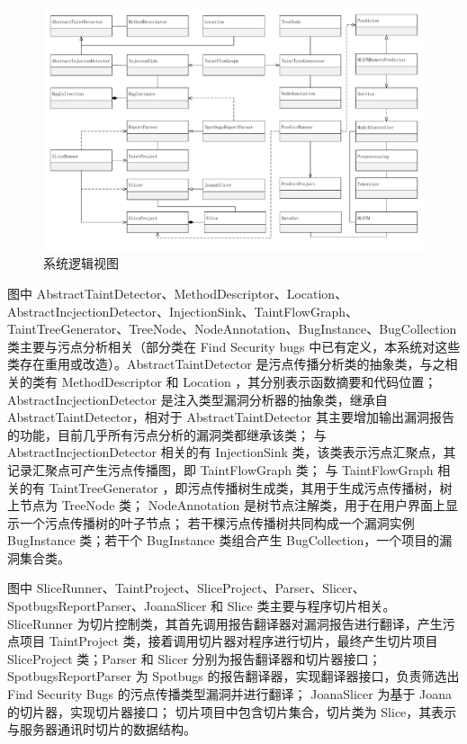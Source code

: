 \begin{figure}[!htbp]
    \centering
    \includegraphics[width=5in]{FIGs/chapter3/viewlogic.pdf}
    \caption{系统逻辑视图}\label{view:logic}
\end{figure}

图中 AbstractTaintDetector、MethodDescriptor、Location、AbstractIncjectionDetector、InjectionSink、TaintFlowGraph、TaintTreeGenerator、TreeNode、NodeAnnotation、BugInstance、BugCollection 类主要与污点分析相关（部分类在 Find Security bugs 中已有定义，本系统对这些类存在重用或改造）。AbstractTaintDetector 是污点传播分析类的抽象类，与之相关的类有 MethodDescriptor 和 Location ，其分别表示函数摘要和代码位置；
AbstractIncjectionDetector 是注入类型漏洞分析器的抽象类，继承自 AbstractTaintDetector，相对于 AbstractTaintDetector 其主要增加输出漏洞报告的功能，目前几乎所有污点分析的漏洞类都继承该类；
与 AbstractIncjectionDetector 相关的有 InjectionSink 类，该类表示污点汇聚点，其记录汇聚点可产生污点传播图，即 TaintFlowGraph 类；
与 TaintFlowGraph 相关的有 TaintTreeGenerator ，即污点传播树生成类，其用于生成污点传播树，树上节点为 TreeNode 类；
NodeAnnotation 是树节点注解类，用于在用户界面上显示一个污点传播树的叶子节点；
若干棵污点传播树共同构成一个漏洞实例 BugInstance 类；若干个 BugInstance 类组合产生 BugCollection，一个项目的漏洞集合类。

图中 SliceRunner、TaintProject、SliceProject、Parser、Slicer、SpotbugsReportParser、JoanaSlicer 和 Slice 类主要与程序切片相关。
SliceRunner 为切片控制类，其首先调用报告翻译器对漏洞报告进行翻译，产生污点项目 TaintProject 类，接着调用切片器对程序进行切片，最终产生切片项目 SliceProject 类；Parser 和 Slicer 分别为报告翻译器和切片器接口；
SpotbugsReportParser 为 Spotbugs 的报告翻译器，实现翻译器接口，负责筛选出 Find Security Bugs 的污点传播类型漏洞并进行翻译；
JoanaSlicer 为基于 Joana 的切片器，实现切片器接口；
切片项目中包含切片集合，切片类为 Slice，其表示与服务器通讯时切片的数据结构。

